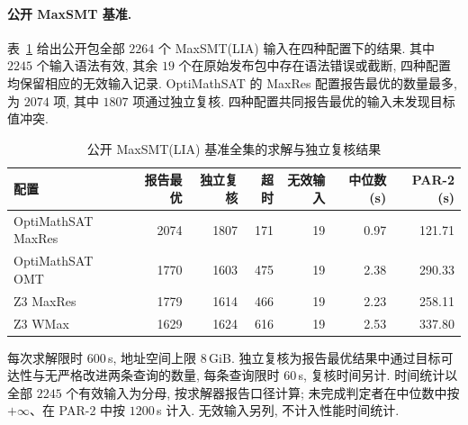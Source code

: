 
\paragraph{公开 MaxSMT 基准.}
表~\ref{tab:exp-public-maxsmt-full} 给出公开包全部 $2264$ 个 MaxSMT(LIA) 输入在四种配置下的结果. 其中 $2245$ 个输入语法有效, 其余 $19$ 个在原始发布包中存在语法错误或截断, 四种配置均保留相应的无效输入记录. OptiMathSAT 的 MaxRes 配置报告最优的数量最多, 为 $2074$ 项, 其中 $1807$ 项通过独立复核. 四种配置共同报告最优的输入未发现目标值冲突.

\begin{table}[!ht]
\centering
\caption{公开 MaxSMT(LIA) 基准全集的求解与独立复核结果}
\label{tab:exp-public-maxsmt-full}
\small
\begin{tabular}{@{}l rrrr rr@{}}
\toprule
配置 & 报告最优 & 独立复核 & 超时 & 无效输入 & 中位数 (s) & PAR-2 (s) \\
\midrule
OptiMathSAT MaxRes & 2074 & 1807 & 171 & 19 & 0.97 & 121.71 \\
OptiMathSAT OMT & 1770 & 1603 & 475 & 19 & 2.38 & 290.33 \\
Z3 MaxRes & 1779 & 1614 & 466 & 19 & 2.23 & 258.11 \\
Z3 WMax & 1629 & 1624 & 616 & 19 & 2.53 & 337.80 \\
\bottomrule
\end{tabular}
\par\smallskip
\begin{minipage}{\linewidth}\footnotesize 每次求解限时 $600$\,s, 地址空间上限 $8$\,GiB. 独立复核为报告最优结果中通过目标可达性与无严格改进两条查询的数量, 每条查询限时 $60$\,s, 复核时间另计. 时间统计以全部 $2245$ 个有效输入为分母, 按求解器报告口径计算; 未完成判定者在中位数中按 $+\infty$、在 PAR-2 中按 $1200$\,s 计入. 无效输入另列, 不计入性能时间统计.
\end{minipage}
\end{table}

